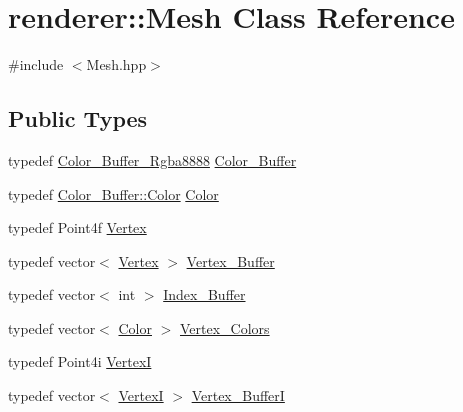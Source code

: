 \hypertarget{classrenderer_1_1_mesh}{}\section{renderer\+::Mesh Class Reference}
\label{classrenderer_1_1_mesh}


{\ttfamily \#include $<$Mesh.\+hpp$>$}

\subsection*{Public Types}
\begin{DoxyCompactItemize}
\item 
typedef \mbox{\hyperlink{classrenderer_1_1_color___buffer___rgba8888}{Color\+\_\+\+Buffer\+\_\+\+Rgba8888}} \mbox{\hyperlink{classrenderer_1_1_mesh_aeb2cb93e67b18f09a15e7ece644f919b}{Color\+\_\+\+Buffer}}
\item 
typedef \mbox{\hyperlink{structrenderer_1_1_color___buffer___rgba8888_1_1_color}{Color\+\_\+\+Buffer\+::\+Color}} \mbox{\hyperlink{classrenderer_1_1_mesh_a71276bd4511d4593f1deaae6d464e811}{Color}}
\item 
typedef Point4f \mbox{\hyperlink{classrenderer_1_1_mesh_ab0cb2995275ebaa8ae9e5fbb5519b7f3}{Vertex}}
\item 
typedef vector$<$ \mbox{\hyperlink{classrenderer_1_1_mesh_ab0cb2995275ebaa8ae9e5fbb5519b7f3}{Vertex}} $>$ \mbox{\hyperlink{classrenderer_1_1_mesh_a8c848a95f65fb25f6dc94dcb8879cf8b}{Vertex\+\_\+\+Buffer}}
\item 
typedef vector$<$ int $>$ \mbox{\hyperlink{classrenderer_1_1_mesh_a6a226cb85370a00787fe01f70a0b5ca2}{Index\+\_\+\+Buffer}}
\item 
typedef vector$<$ \mbox{\hyperlink{classrenderer_1_1_mesh_a71276bd4511d4593f1deaae6d464e811}{Color}} $>$ \mbox{\hyperlink{classrenderer_1_1_mesh_ab384ccca7ccccac4b935fe797ce0a7ea}{Vertex\+\_\+\+Colors}}
\item 
typedef Point4i \mbox{\hyperlink{classrenderer_1_1_mesh_a5fd87426b3c8820d68414531423446fc}{VertexI}}
\item 
typedef vector$<$ \mbox{\hyperlink{classrenderer_1_1_mesh_a5fd87426b3c8820d68414531423446fc}{VertexI}} $>$ \mbox{\hyperlink{classrenderer_1_1_mesh_ac5074bb370a7062d07e11150de94e8be}{Vertex\+\_\+\+BufferI}}
\end{DoxyCompactItemize}
